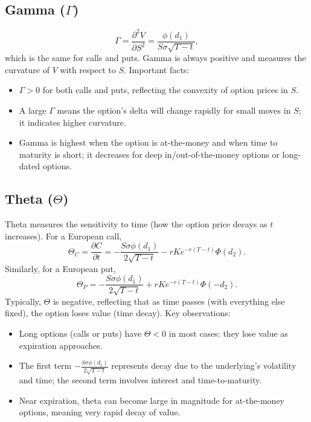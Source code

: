\subsection*{Gamma (\(\Gamma\))}
\[
\Gamma = \frac{\partial^2 V}{\partial S^2} 
= \frac{\phi(d_1)}{S \sigma \sqrt{T-t}},
\]
which is the same for calls and puts.  Gamma is always positive and measures the curvature of \(V\) with respect to \(S\).  Important facts:
\begin{itemize}
    \item \(\Gamma > 0\) for both calls and puts, reflecting the convexity of option prices in \(S\).
    \item A large \(\Gamma\) means the option's delta will change rapidly for small moves in \(S\); it indicates higher curvature.
    \item Gamma is highest when the option is at-the-money and when time to maturity is short; it decreases for deep in/out-of-the-money options or long-dated options.
\end{itemize}

\subsection*{Theta (\(\Theta\))}
Theta measures the sensitivity to time (how the option price decays as \(t\) increases).  For a European call,
\[
\Theta_C = \frac{\partial C}{\partial t}
= -\frac{S\sigma\phi(d_1)}{2\sqrt{T-t}} - rK e^{-r(T-t)}\Phi(d_2).
\]
Similarly, for a European put,
\[
\Theta_P = -\frac{S\sigma\phi(d_1)}{2\sqrt{T-t}} + rK e^{-r(T-t)}\Phi(-d_2).
\]
Typically, \(\Theta\) is negative, reflecting that as time passes (with everything else fixed), the option loses value (time decay).  Key observations:
\begin{itemize}
    \item Long options (calls or puts) have \(\Theta < 0\) in most cases: they lose value as expiration approaches.
    \item The first term \(-\frac{S\sigma\phi(d_1)}{2\sqrt{T-t}}\) represents decay due to the underlying's volatility and time; the second term involves interest and time-to-maturity.
    \item Near expiration, theta can become large in magnitude for at-the-money options, meaning very rapid decay of value.
\end{itemize}

